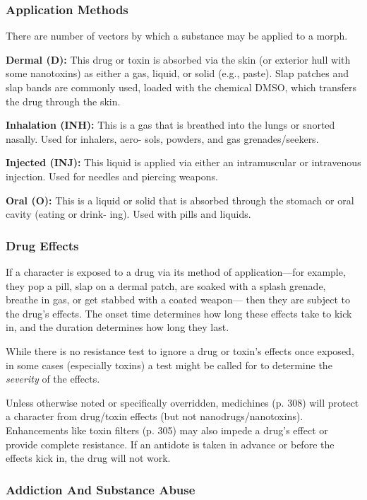 \subsubsection{Application Methods}

There are number of vectors by which a substance 
may be applied to a morph.

\textbf{Dermal (D): }This drug or toxin is absorbed via 
the skin (or exterior hull with some nanotoxins) as 
either a gas, liquid, or solid (e.g., paste). Slap patches 
and slap bands are commonly used, loaded with the 
chemical DMSO, which transfers the drug through 
the skin.

\textbf{Inhalation (INH):} This is a gas that is breathed into 
the lungs or snorted nasally. Used for inhalers, aero-
sols, powders, and gas grenades/seekers.

\textbf{Injected (INJ): }This liquid is applied via either 
an intramuscular or intravenous injection. Used for 
needles and piercing weapons.

\textbf{Oral (O):} This is a liquid or solid that is absorbed 
through the stomach or oral cavity (eating or drink-
ing). Used with pills and liquids.

\subsubsection{Drug Effects}

If a character is exposed to a drug via its method of 
application—for example, they pop a pill, slap on 
a dermal patch, are soaked with a splash grenade, 
breathe in gas, or get stabbed with a coated weapon—
then they are subject to the drug's effects. The onset 
time determines how long these effects take to kick in, 
and the duration determines how long they last.

While there is no resistance test to ignore a drug or 
toxin's effects once exposed, in some cases (especially 
toxins) a test might be called for to determine the 
\textit{severity} of the effects. 

Unless otherwise noted or specifically overridden, 
medichines (p. 308) will protect a character from 
drug/toxin effects (but not nanodrugs/nanotoxins). 
Enhancements like toxin filters (p. 305) may also 
impede a drug's effect or provide complete resistance. 
If an antidote is taken in advance or before the effects 
kick in, the drug will not work.

\subsubsection{Addiction And Substance Abuse}

